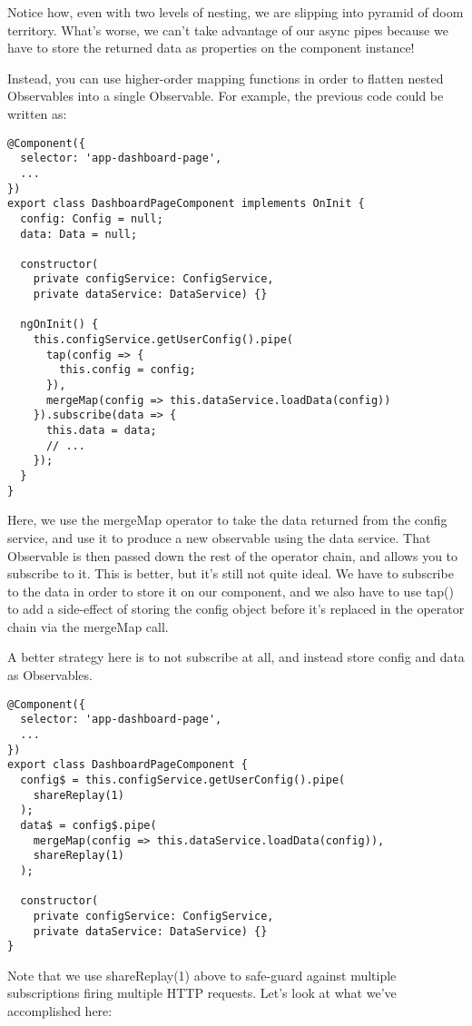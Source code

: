 Notice how, even with two levels of nesting, we are slipping into pyramid of doom territory. What's worse, we can't take advantage of our async pipes because we have to store the returned data as properties on the component instance!

Instead, you can use higher-order mapping functions in order to flatten nested Observables into a single Observable. For example, the previous code could be written as: 
\begin{lstlisting}
@Component({
  selector: 'app-dashboard-page',
  ...
})
export class DashboardPageComponent implements OnInit {
  config: Config = null;
  data: Data = null;

  constructor(
    private configService: ConfigService, 
    private dataService: DataService) {}

  ngOnInit() {
    this.configService.getUserConfig().pipe(
      tap(config => {
        this.config = config;
      }),
      mergeMap(config => this.dataService.loadData(config))
    }).subscribe(data => {
      this.data = data;
      // ...
    });
  }
}  
\end{lstlisting}
Here, we use the mergeMap operator to take the data returned from the config service, and use it to produce a new observable using the data service. That Observable is then passed down the rest of the operator chain, and allows you to subscribe to it. This is better, but it’s still not quite ideal. We have to subscribe to the data in order to store it on our component, and we also have to use tap() to add a side-effect of storing the config object before it’s replaced in the operator chain via the mergeMap call.

A better strategy here is to not subscribe at all, and instead store config and data as Observables.

\begin{lstlisting}
@Component({
  selector: 'app-dashboard-page',
  ...
})
export class DashboardPageComponent {
  config$ = this.configService.getUserConfig().pipe(
    shareReplay(1)
  );
  data$ = config$.pipe(
    mergeMap(config => this.dataService.loadData(config)),
    shareReplay(1)
  );

  constructor(
    private configService: ConfigService, 
    private dataService: DataService) {}
}  
\end{lstlisting}

Note that we use shareReplay(1) above to safe-guard against multiple subscriptions firing multiple HTTP requests.
Let’s look at what we’ve accomplished here:

